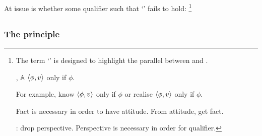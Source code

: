 \begin{note}
  At issue is whether some qualifier such that `\emph{}' fails to hold:%
  \footnote{
    The term `\emph{}' is designed to highlight the parallel between \emph{} and \factivity{}.

    , \(\mathbb{A}\) \(\langle \phi, v \rangle\) only if \(\phi\).

    For example, know \(\langle \phi, v \rangle\) only if \(\phi\) or realise \(\langle \phi, v \rangle\) only if \(\phi\).

    Fact is necessary in order to have attitude.
    From attitude, get fact.

    : drop perspective.
    Perspective is necessary in order for qualifier.
  }
\end{note}

\subsection{}
\label{cha:zSpA:sec:ptivity}

\subsubsection{The principle}

